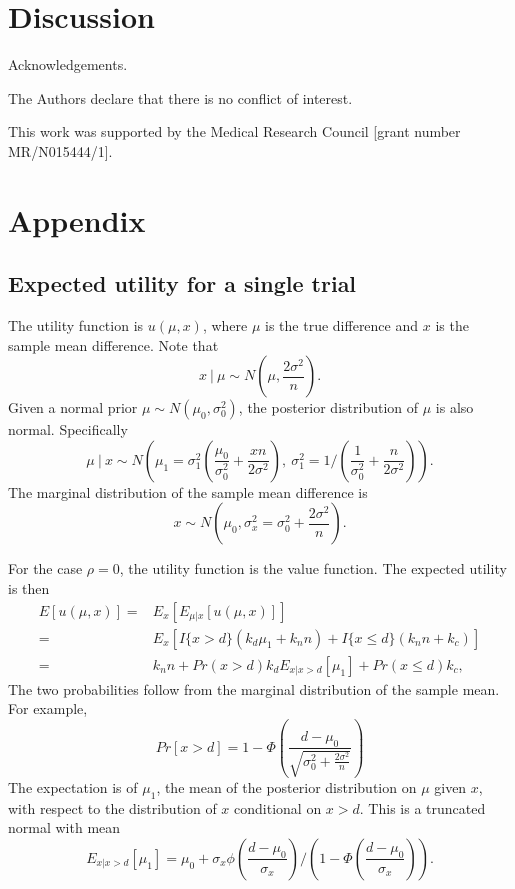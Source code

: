 \documentclass[sagev]{sagej}
\begin{document}
\section{Discussion}



\begin{acks}
Acknowledgements.
\end{acks}

\begin{dci}
The Authors declare that there is no conflict of interest.
\end{dci}

\begin{funding}
This work was supported by the Medical Research Council [grant number MR/N015444/1].
\end{funding}




\section*{Appendix}

\subsection*{Expected utility for a single trial}

The utility function is $u(\mu, x)$, where $\mu$ is the true difference and $x$ is the sample mean difference. Note that
$$
x ~|~ \mu \sim N\left(\mu, \frac{2\sigma^2}{n} \right).
$$
Given a normal prior $\mu \sim N(\mu_0, \sigma_0^2)$, the posterior distribution of $\mu$ is also normal. Specifically
$$
\mu ~|~ x \sim N \left( \mu_1 = \sigma_1^2 \left( \frac{\mu_0}{\sigma_0^2} + \frac{xn}{2\sigma^2} \right), ~ \sigma_1^2 = 1/\left( \frac{1}{\sigma_0^2} + \frac{n}{2\sigma^2} \right) \right).
$$
The marginal distribution of the sample mean difference is
$$
x \sim N\left(\mu_0, \sigma_x^2 = \sigma_0^2 + \frac{2\sigma^2}{n} \right).
$$

For the case $\rho = 0$, the utility function is the value function. The expected utility is then
\begin{align*}
E[u(\mu, x)] =& E_x\left[ E_{\mu | x} [u(\mu, x)] \right] \\
=& E_x \left[ I\{x > d\} (k_d \mu_1 + k_n n) + I\{x \leq d\} (k_n n + k_c) \right] \\
=& k_n n + Pr(x > d) k_d E_{x | x > d} \left[ \mu_1 \right] + Pr(x \leq d)k_c,
\end{align*}
The two probabilities follow from the marginal distribution of the sample mean. For example,
$$
Pr[x > d] = 1- \Phi\left(\frac{d-\mu_0}{\sqrt{\sigma_0^2 + \frac{2\sigma^2}{n}}} \right)
$$
The expectation is of $\mu_1$, the mean of the posterior distribution on $\mu$ given $x$, with respect to the distribution of $x$ conditional on $x > d$. This is a truncated normal with mean
$$
E_{x | x > d} \left[ \mu_1 \right] = \mu_0 + \sigma_x \phi\left(\frac{d - \mu_0}{\sigma_x} \right)/\left(1 - \Phi\left(\frac{d - \mu_0}{\sigma_x}\right) \right).
$$
\end{document}
